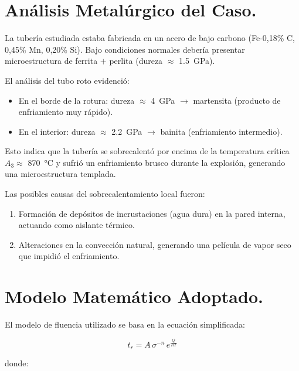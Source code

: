 \documentclass[12pt,a4paper]{article}
\begin{document}
\section{Análisis Metalúrgico del Caso.}
La tubería estudiada estaba fabricada en un acero de bajo carbono (Fe-0,18\% C, 0,45\% Mn, 0,20\% Si). Bajo condiciones normales debería presentar microestructura de ferrita $+$ perlita (dureza $\approx$ \SI{1,5}{\giga\pascal}).

El análisis del tubo roto evidenció:

\begin{itemize}
    \item En el borde de la rotura: dureza $\approx$ \SI{4}{\giga\pascal} $\rightarrow$ martensita (producto de enfriamiento muy rápido).
    \item En el interior: dureza $\approx$ \SI{2,2}{\giga\pascal} $\rightarrow$ bainita (enfriamiento intermedio).
\end{itemize}

Esto indica que la tubería se sobrecalentó por encima de la temperatura crítica $A_3 \approx$ \SI{870}{\celsius} y sufrió un enfriamiento brusco durante la explosión, generando una microestructura templada.

Las posibles causas del sobrecalentamiento local fueron:

\begin{enumerate}
    \item Formación de depósitos de incrustaciones (agua dura) en la pared interna, actuando como aislante térmico.
    \item Alteraciones en la convección natural, generando una película de vapor seco que impidió el enfriamiento.
\end{enumerate}

\section{Modelo Matemático Adoptado.}

El modelo de fluencia utilizado se basa en la ecuación simplificada:

\begin{equation}
    t_r = A \, \sigma^{-n} \, e^{\frac{Q}{R T}}
\end{equation}

donde:
\end{document}
